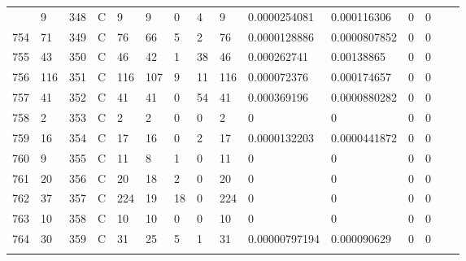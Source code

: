 \begin{longtable}{lllllllllllllll}
\begin{comment}
	753 & 9                 & 348 & C   & 9                 & 9                 & 0                 & 4    & 9          & 0.0000254081   & 0.000116306    & 0             & 0            \\
	754 & 71                & 349 & C   & 76                & 66                & 5                 & 2    & 76         & 0.0000128886   & 0.0000807852   & 0             & 0            \\
	755 & 43                & 350 & C   & 46                & 42                & 1                 & 38   & 46         & 0.000262741    & 0.00138865     & 0             & 0            \\
	756 & 116               & 351 & C   & 116               & 107               & 9                 & 11   & 116        & 0.000072376    & 0.000174657    & 0             & 0            \\
	757 & 41                & 352 & C   & 41                & 41                & 0                 & 54   & 41         & 0.000369196    & 0.0000880282   & 0             & 0            \\
	758 & 2                 & 353 & C   & 2                 & 2                 & 0                 & 0    & 2          & 0              & 0              & 0             & 0            \\
	759 & 16                & 354 & C   & 17                & 16                & 0                 & 2    & 17         & 0.0000132203   & 0.0000441872   & 0             & 0            \\
	760 & 9                 & 355 & C   & 11                & 8                 & 1                 & 0    & 11         & 0              & 0              & 0             & 0            \\
	761 & 20                & 356 & C   & 20                & 18                & 2                 & 0    & 20         & 0              & 0              & 0             & 0            \\
	762 & 37                & 357 & C   & 224               & 19                & 18                & 0    & 224        & 0              & 0              & 0             & 0            \\
	763 & 10                & 358 & C   & 10                & 10                & 0                 & 0    & 10         & 0              & 0              & 0             & 0            \\
	764 & 30                & 359 & C   & 31                & 25                & 5                 & 1    & 31         & 0.00000797194  & 0.000090629    & 0             & 0            \\

\end{comment}
\end{longtable}

